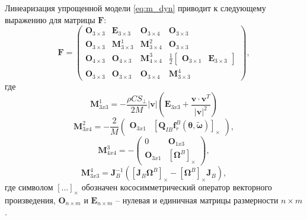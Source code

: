 Линеаризация упрощенной модели \eqref{eq:m_dyn} приводит к следующему выражению для матрицы $\bm F$:
\begin{equation}
{\bm{F}} =
\left( {\begin{array}{*{20}{c}}
	{{{\bm{O}}_{3\times3}}}&{{{\bm{E}}_{3\times3}}}&{{{\bm{O}}_{3\times4}}}&{{{\bm{O}}_{3\times3}}}\\
	{{{\bm{O}}_{3\times3}}}&{{\bm{M}}_{3\times3}^1}&{{\bm{M}}_{3\times4}^2}&{{{\bm{O}}_{3\times3}}}\\
	{{{\bm{O}}_{4\times3}}}&{{{\bm{O}}_{4\times3}}}&{{\bm{M}}_{4\times4}^3}&{\frac{1}{2}\left[ {\begin{array}{*{20}{c}}
			{{{\bm{O}}_{3\times1}}}&{{{\bm{E}}_{3\times3}}}
			\end{array}} \right]}\\
	{{{\bm{O}}_{3\times3}}}&{{{\bm{O}}_{3\times3}}}&{{{\bm{O}}_{3\times4}}}&{{\bm{M}}_{3\times3}^4}
	\end{array}} \right),
\end{equation}
где
\begin{equation}
{{\bm{M}}_{3x3}^1 =  - \frac{{\rho C{S_ \bot }}}{{2M}}\left| {\bm{v}} \right|\left( {{{\bm{E}}_{3x3}} + \frac{{{\bm{v}} \cdot {{\bm{v}}^T}}}{{{{\left| {\bm{v}} \right|}^2}}}} \right)}
\end{equation}
\vspace{3mm}
\begin{equation}
{{\bm{M}}_{3x4}^2 =  - \frac{2}{M}\left( {\begin{array}{*{20}{c}}
		{{{\bm{O}}_{3x1}}}&{{{\left[ {{{\bm{Q}}_{IB}}{\bm{f}}_{\ddot r}^B({\bm{\theta }},{\bm{\tilde \omega }})} \right]}_ \times }}
		\end{array}} \right)},
\end{equation}
\vspace{3mm}
\begin{equation}
{\bm{M}}_{4x4}^3 =  - \left( {\begin{array}{*{20}{c}}
	0&{{{\bm{O}}_{1x3}}}\\
	{{{\bm{O}}_{3x1}}}&{{{[{{\bm{\Omega }}^B}]}_ \times }}
	\end{array}} \right),
\end{equation}
\vspace{3mm}
\begin{equation}
{{\bm{M}}_{3x3}^4 = {\bm{J}}_B^{ - 1}\left( {{{\left[ {{{\bm{J}}_B}{{\bm{\Omega }}^B}} \right]}_ \times } - {{\left[ {{{\bm{\Omega }}^B}} \right]}_ \times }{{\bm{J}}_B}} \right)},
\end{equation}
где символом ${\left[ {...} \right]_ \times }$  обозначен кососимметрический оператор векторного произведения,
${{{\bm{O}}_{n\times m}}}$ и ${{{\bm{E}}_{n\times m}}}$ -- нулевая и единичная матрицы размерности $n \times m$.


